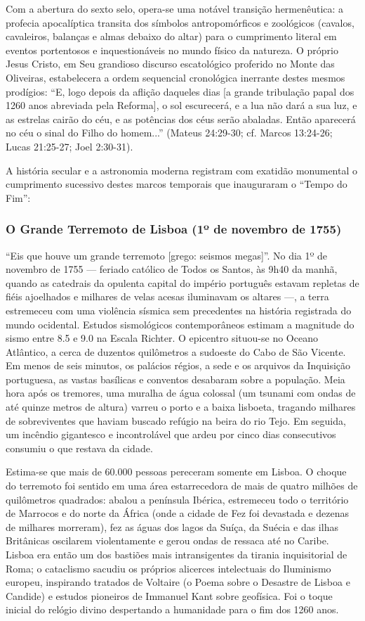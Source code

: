 Com a abertura do sexto selo, opera-se uma notável transição hermenêutica: a profecia apocalíptica transita dos símbolos antropomórficos e zoológicos (cavalos, cavaleiros, balanças e almas debaixo do altar) para o cumprimento literal em eventos portentosos e inquestionáveis no mundo físico da natureza.
O próprio Jesus Cristo, em Seu grandioso discurso escatológico proferido no Monte das Oliveiras, estabelecera a ordem sequencial cronológica inerrante destes mesmos prodígios:
``E, logo depois da aflição daqueles dias [a grande tribulação papal dos 1260 anos abreviada pela Reforma], o sol escurecerá, e a lua não dará a sua luz, e as estrelas cairão do céu, e as potências dos céus serão abaladas. Então aparecerá no céu o sinal do Filho do homem...'' (Mateus 24:29-30; cf. Marcos 13:24-26; Lucas 21:25-27; Joel 2:30-31).

A história secular e a astronomia moderna registram com exatidão monumental o cumprimento sucessivo destes marcos temporais que inauguraram o ``Tempo do Fim'':


\subsubsection*{O Grande Terremoto de Lisboa (1º de novembro de 1755)}
``Eis que houve um grande terremoto [grego: seismos megas]''.
No dia 1º de novembro de 1755 — feriado católico de Todos os Santos, às 9h40 da manhã, quando as catedrais da opulenta capital do império português estavam repletas de fiéis ajoelhados e milhares de velas acesas iluminavam os altares —, a terra estremeceu com uma violência sísmica sem precedentes na história registrada do mundo ocidental.
Estudos sismológicos contemporâneos estimam a magnitude do sismo entre 8.5 e 9.0 na Escala Richter. O epicentro situou-se no Oceano Atlântico, a cerca de duzentos quilômetros a sudoeste do Cabo de São Vicente. Em menos de seis minutos, os palácios régios, a sede e os arquivos da Inquisição portuguesa, as vastas basílicas e conventos desabaram sobre a população. Meia hora após os tremores, uma muralha de água colossal (um tsunami com ondas de até quinze metros de altura) varreu o porto e a baixa lisboeta, tragando milhares de sobreviventes que haviam buscado refúgio na beira do rio Tejo. Em seguida, um incêndio gigantesco e incontrolável que ardeu por cinco dias consecutivos consumiu o que restava da cidade.

Estima-se que mais de 60.000 pessoas pereceram somente em Lisboa. O choque do terremoto foi sentido em uma área estarrecedora de mais de quatro milhões de quilômetros quadrados: abalou a península Ibérica, estremeceu todo o território de Marrocos e do norte da África (onde a cidade de Fez foi devastada e dezenas de milhares morreram), fez as águas dos lagos da Suíça, da Suécia e das ilhas Britânicas oscilarem violentamente e gerou ondas de ressaca até no Caribe. Lisboa era então um dos bastiões mais intransigentes da tirania inquisitorial de Roma; o cataclismo sacudiu os próprios alicerces intelectuais do Iluminismo europeu, inspirando tratados de Voltaire (o Poema sobre o Desastre de Lisboa e Candide) e estudos pioneiros de Immanuel Kant sobre geofísica. Foi o toque inicial do relógio divino despertando a humanidade para o fim dos 1260 anos.



